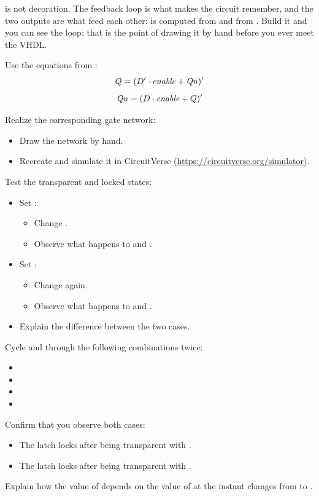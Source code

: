  is not decoration. The feedback loop is what makes the circuit remember, and the two
outputs are what feed each other:  is computed from  and  from .
Build it and you can see the loop; that is the point of drawing it by hand before you ever meet the
VHDL.

Use the equations from :
\[ Q = (D' \cdot \mathit{enable} + \mathit{Qn})' \]
\[ \mathit{Qn} = (D \cdot \mathit{enable} + Q)' \]

\begin{parts}
  \item Realize the corresponding gate network:
    \begin{itemize}
      \item Draw the network by hand.
      \item Recreate and simulate it in CircuitVerse (\url{https://circuitverse.org/simulator}).
    \end{itemize}
  \item Test the transparent and locked states:
    \begin{itemize}
      \item Set :
        \begin{itemize}
          \item Change .
          \item Observe what happens to  and .
        \end{itemize}
      \item Set :
        \begin{itemize}
          \item Change  again.
          \item Observe what happens to  and .
        \end{itemize}
      \item Explain the difference between the two cases.
    \end{itemize}
  \item Cycle  and  through the following combinations twice:
    \begin{itemize}
      \item {}
      \item {}
      \item {}
      \item {}
    \end{itemize}
    Confirm that you observe both cases:
    \begin{itemize}
      \item The latch locks after being transparent with .
      \item The latch locks after being transparent with .
    \end{itemize}
    Explain how the value of  depends on the value of  at the instant 
    changes from  to .
\end{parts}

